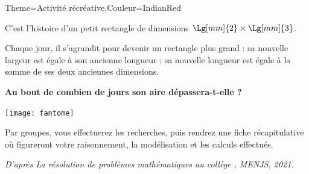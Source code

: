 \begin{Maquette}[Cours]{Theme={Activité récréative},Couleur={IndianRed}}
    

      C’est l’histoire d’un petit rectangle de dimensions $\Lg[mm]{2}\times\Lg[mm]{3}$. \par
      Chaque jour, il s’agrandit pour devenir un rectangle plus grand : sa nouvelle largeur est égale à son ancienne longueur ; sa nouvelle longueur est égale à la somme de ses deux anciennes dimensions. \par \bigskip
      
      {\bf Au bout de combien de jours son aire dépassera-t-elle  ?} \par

      \begin{center}
         \texttt{[image: fantome]}   
      \end{center}
      
      \bigskip

      Par groupes, vous effectuerez les recherches, puis rendrez une fiche récapitulative où figureront votre raisonnement, la modélisation et les calculs effectués.

   \vfill \hfill {\it\footnotesize D'après \og La résolution de problèmes mathématiques au collège \fg, MENJS, 2021.}

\end{Maquette}